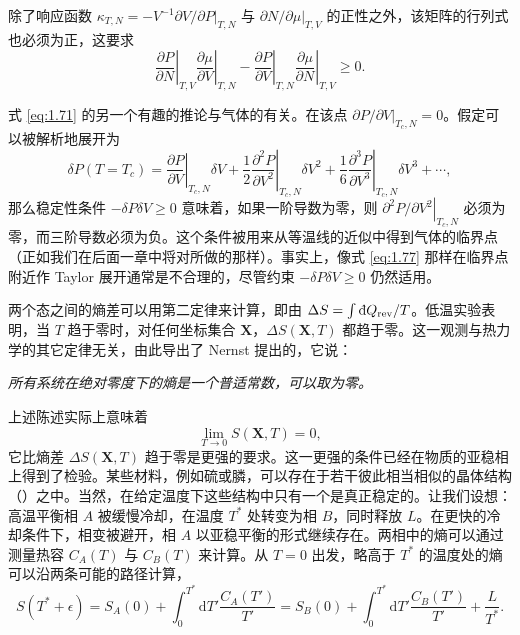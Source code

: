 除了响应函数 $\kappa_{T,N}=-V^{-1}\left.\partial V/\partial P\right|_{T,N}$ 与 $\left.\partial N/\partial\mu\right|_{T,V}$ 的正性之外，该矩阵的行列式也必须为正，这要求
\begin{equation}
\left.\frac{\partial P}{\partial N}\right|_{T,V}\left.\frac{\partial\mu}{\partial V}\right|_{T,N}-\left.\frac{\partial P}{\partial V}\right|_{T,N}\left.\frac{\partial\mu}{\partial N}\right|_{T,V}\ge0.
\label{eq:1.76}
\end{equation}

式 \eqref{eq:1.71} 的另一个有趣的推论与气体的有关。在该点 $\left.\partial P/\partial V\right|_{T_c,N}=0$。假定可以被解析地展开为
\begin{equation}
\delta P(T=T_c)=\left.\frac{\partial P}{\partial V}\right|_{T_c,N}\delta V+\frac{1}{2}\left.\frac{\partial^2P}{\partial V^2}\right|_{T_c,N}\delta V^2+\frac{1}{6}\left.\frac{\partial^3P}{\partial V^3}\right|_{T_c,N}\delta V^3+\cdots,
\label{eq:1.77}
\end{equation}
那么稳定性条件 $-\delta P\delta V\ge0$ 意味着，如果一阶导数为零，则 $\left.\partial^2P/\partial V^2\right|_{T_c,N}$ 必须为零，而三阶导数必须为负。这个条件被用来从等温线的近似中得到气体的临界点（正如我们在后面一章中将对所做的那样）。事实上，像式 \eqref{eq:1.77} 那样在临界点附近作 Taylor 展开通常是不合理的，尽管约束 $-\delta P\delta V\ge0$ 仍然适用。



两个态之间的熵差可以用第二定律来计算，即由 $\Delta S=\int\inexd Q_{\text{rev}}/T$。低温实验表明，当 $T$ 趋于零时，对任何坐标集合 $\bm{X}$，$\Delta S(\bm{X},T)$ 都趋于零。这一观测与热力学的其它定律无关，由此导出了 Nernst 提出的，它说：

\emph{所有系统在绝对零度下的熵是一个普适常数，可以取为零。}

上述陈述实际上意味着
\begin{equation}
\lim_{T\to0}S(\bm{X},T)=0,
\label{eq:1.78}
\end{equation}
它比熵差 $\Delta S(\bm{X},T)$ 趋于零是更强的要求。这一更强的条件已经在物质的亚稳相上得到了检验。某些材料，例如硫或膦，可以存在于若干彼此相当相似的晶体结构（）之中。当然，在给定温度下这些结构中只有一个是真正稳定的。让我们设想：高温平衡相 $A$ 被缓慢冷却，在温度 $T^*$ 处转变为相 $B$，同时释放 $L$。在更快的冷却条件下，相变被避开，相 $A$ 以亚稳平衡的形式继续存在。两相中的熵可以通过测量热容 $C_A(T)$ 与 $C_B(T)$ 来计算。从 $T=0$ 出发，略高于 $T^*$ 的温度处的熵可以沿两条可能的路径计算，
\begin{equation}
S(T^*+\epsilon)=S_A(0)+\int_0^{T^*}\mathrm{d}T'\frac{C_A(T')}{T'}=S_B(0)+\int_0^{T^*}\mathrm{d}T'\frac{C_B(T')}{T'}+\frac{L}{T^*}.
\label{eq:1.79}
\end{equation}

